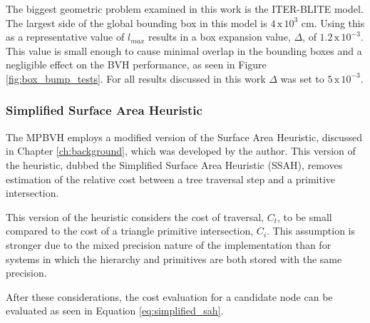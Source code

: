 The biggest geometric problem examined in this work is the ITER-BLITE model. The
largest side of the global bounding box in this model is $4 \, \text{x} \,
10^{3}$ cm. Using this as a representative value of $l_{max}$ results in a box
expansion value, $\Delta$, of $1.2 \, \text{x} \, 10^{-3}$. This value is small
enough to cause minimal overlap in the bounding boxes and a negligible effect on
the BVH performance, as seen in Figure \ref{fig:box_bump_tests}. For all results
discussed in this work $\Delta$ was set to $5 \, \text{x} \, 10 ^{-3}$.

\subsubsection{Simplified Surface Area Heuristic}

The MPBVH employs a modified version of the Surface Area Heuristic,
discussed in Chapter \ref{ch:background}, which was developed by the
author. This version of the heuristic, dubbed the Simplified Surface Area
Heuristic (SSAH), removes estimation of the relative cost between a tree
traversal step and a primitive intersection.

This version of the heuristic considers the cost of traversal, $C_{t}$, to be
small compared to the cost of a triangle primitive intersection, $C_{i}$. This
assumption is stronger due to the mixed precision nature of the implementation
than for systems in which the hierarchy and primitives are both stored with the
same precision.

After these considerations, the cost evaluation for a candidate node can be
evaluated as seen in Equation \ref{eq:simplified_sah}.

